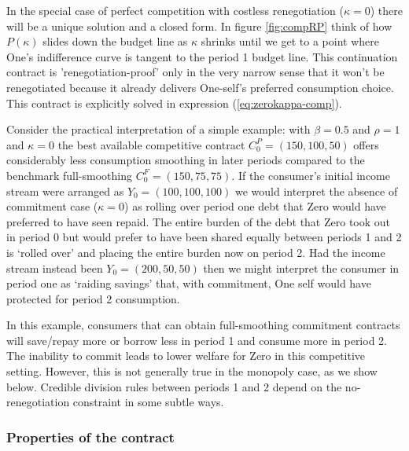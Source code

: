 \documentclass[11pt,english]{article}
\theoremstyle{plain}
\theoremstyle{definition}
\begin{document}
In the special case of perfect competition with costless renegotiation
($\kappa=0$) there will be a unique solution and a closed form. In figure \ref{fig:compRP} think of how $P(\kappa)$ slides down the budget line as $\kappa$ shrinks until we get to a point where One's
indifference curve is tangent to the period 1 budget line. This
continuation contract is 'renegotiation-proof' only in the very
narrow sense that it won't be renegotiated because it already delivers
One-self's preferred consumption choice. This  contract is explicitly solved in expression (\ref{eq:zerokappa-comp}).

Consider the practical interpretation of a simple example: with $\beta=0.5$ and $\rho=1$ and $\kappa=0$ the best available competitive contract $C_{0}^{P}=(150,100,50)$ offers considerably less consumption
smoothing in later periods compared to the benchmark full-smoothing  $C_{0}^{F}=(150,75,75)$. If the consumer's initial income stream
were arranged as $Y_{0}=(100,100,100)$ we would interpret the absence of commitment case  ($\kappa=0$) as rolling over period one debt that Zero would have preferred to have seen repaid. The entire
burden of the debt that Zero took out in period
0 but would prefer to have been shared equally between periods 1 and 2 is `rolled over' and placing the entire burden now on period 2. Had the income stream
instead been $Y_{0}=(200,50,50)$ then we might interpret the consumer in period one as `raiding savings' that, with commitment,   One self would have protected for period 2 consumption.

In this example, consumers that can obtain full-smoothing
commitment contracts  will save/repay more or borrow less in period
1 and consume more in period 2. The inability to commit leads to
lower welfare for Zero in this competitive setting. However, this
is not generally true in the monopoly case, as we show below. Credible division rules between
periods 1 and 2 depend on the no-renegotiation constraint in some
subtle ways.

\subsubsection{Properties of the contract}
\end{document}
